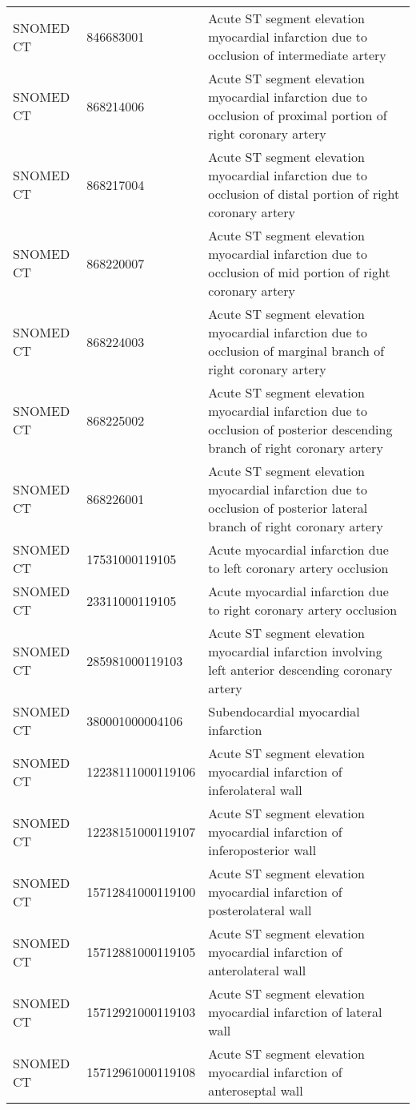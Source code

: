 \begin{longtable}{p{}p{}p{}}
  SNOMED CT & 846683001 & Acute ST segment elevation myocardial infarction due to occlusion of intermediate artery \\ 
  SNOMED CT & 868214006 & Acute ST segment elevation myocardial infarction due to occlusion of proximal portion of right coronary artery \\ 
  SNOMED CT & 868217004 & Acute ST segment elevation myocardial infarction due to occlusion of distal portion of right coronary artery \\ 
  SNOMED CT & 868220007 & Acute ST segment elevation myocardial infarction due to occlusion of mid portion of right coronary artery \\ 
  SNOMED CT & 868224003 & Acute ST segment elevation myocardial infarction due to occlusion of marginal branch of right coronary artery \\ 
  SNOMED CT & 868225002 & Acute ST segment elevation myocardial infarction due to occlusion of posterior descending branch of right coronary artery \\ 
  SNOMED CT & 868226001 & Acute ST segment elevation myocardial infarction due to occlusion of posterior lateral branch of right coronary artery \\ 
  SNOMED CT & 17531000119105 & Acute myocardial infarction due to left coronary artery occlusion \\ 
  SNOMED CT & 23311000119105 & Acute myocardial infarction due to right coronary artery occlusion \\ 
  SNOMED CT & 285981000119103 & Acute ST segment elevation myocardial infarction involving left anterior descending coronary artery \\ 
  SNOMED CT & 380001000004106 & Subendocardial myocardial infarction \\ 
  SNOMED CT & 12238111000119106 & Acute ST segment elevation myocardial infarction of inferolateral wall \\ 
  SNOMED CT & 12238151000119107 & Acute ST segment elevation myocardial infarction of inferoposterior wall \\ 
  SNOMED CT & 15712841000119100 & Acute ST segment elevation myocardial infarction of posterolateral wall \\ 
  SNOMED CT & 15712881000119105 & Acute ST segment elevation myocardial infarction of anterolateral wall \\ 
  SNOMED CT & 15712921000119103 & Acute ST segment elevation myocardial infarction of lateral wall \\ 
  SNOMED CT & 15712961000119108 & Acute ST segment elevation myocardial infarction of anteroseptal wall \\ 

\end{longtable}
